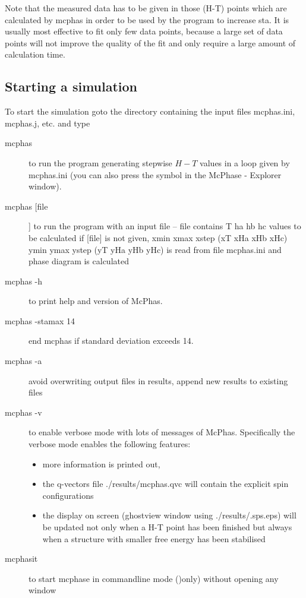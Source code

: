 Note that the measured data has to be given in those (H-T) points which are 
calculated by mcphas in order to be used by the program to increase {\prg sta}.
It is usually most effective to fit only few data points, because a large set
of data points will not improve the quality of the fit and only require a large
amount of calculation time.



\subsection{Starting a simulation}
\label{start}

To start the simulation goto the directory containing the
input files {\prg mcphas.ini, mcphas.j, etc. } and type

\begin{description}
\item[\prg mcphas] to run the program generating stepwise $H-T$ values 
              in a loop given by {\prg mcphas.ini} (you can also press the
              symbol in the {\prg McPhase - Explorer} window).
\item[\prg mcphas [file]]  to run the program with an input file --   
             {\prg file} contains T ha hb hc values to be calculated 
             if [file] is not given, xmin xmax xstep (xT xHa xHb xHc)
             ymin ymax ystep (yT yHa yHb yHc) is read from file {\prg mcphas.ini}
	     and phase diagram is calculated
\item[\prg mcphas -h]  to  print help and version of {\prg McPhas}.
\item[\prg mcphas -stamax 14]  end mcphas if standard deviation exceeds 14.
\item[\prg mcphas -a] avoid overwriting output files in results, append new results to existing files
\item[\prg mcphas -v]  to  enable verbose mode with lots of messages of {\prg McPhas}. Specifically
the verbose mode enables the following features:
  \begin{itemize}
			          \item more information is printed out, 
			          \item the q-vectors file {\prg ./results/mcphas.qvc} will contain 
				    the explicit spin configurations
			          \item the display on screen (ghostview window using 
				     {\prg ./results/.sps.eps}) will be updated not only 
				    when a H-T point has been finished but always 
				    when a structure with smaller free energy 
				    has been stabilised
  \end{itemize}
\item[\prg mcphasit] to start mcphase in commandline mode ()only) without opening any window
\end{description}

